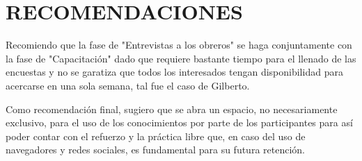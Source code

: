 \section{RECOMENDACIONES}
    Recomiendo que la fase de "Entrevistas a los obreros" se haga conjuntamente con la fase de "Capacitación" dado que requiere bastante tiempo para el llenado de las encuestas y no se garatiza que todos los interesados tengan disponibilidad para acercarse en una sola semana, tal fue el caso de Gilberto.
    
    Como recomendación final, sugiero que se abra un espacio, no necesariamente exclusivo, para el uso de los conocimientos por parte de los participantes para así poder contar con el refuerzo y la práctica libre que, en caso del uso de navegadores y redes sociales, es fundamental para su futura retención.
    \pagebreak